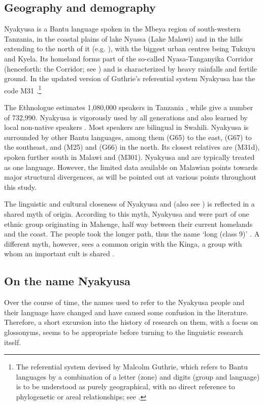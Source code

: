 \subsection{Geography and demography}
Nyakyusa is a Bantu language spoken in the Mbeya region of south-western Tanzania, in the coastal plains of lake Nyassa (Lake Malawi) and in the hills extending to the north of it (e.g. \citealt[1]{WilsonM1963}), with the biggest urban centres being Tukuyu and Kyela. Its homeland forms part of the so-called Nyasa-Tanganyika Corridor (henceforth: the Corridor; see ) and is characterized by heavy rainfalls and fertile ground. In the updated version of Guthrie's referential system Nyakyusa has the code M31 \citep{MahoJ2009}.\footnote{The referential system devised by Malcolm Guthrie, which refers to Bantu languages by a combination of a letter (zone) and digits (group and language) is to be understood as purely geographical, with no direct reference to phylogenetic or areal relationships; see \citet{MahoJ2003}.}

The Ethnologue estimates 1,080,000 speakers in Tanzania \citep{SimonsGFeddingC2017}, while \citet{MuzaleRRugemaliraJ2008} give a number of 732,990. Nyakyusa is vigorously used by all generations and also learned by local non-native speakers \citep{LewisM2009}. Most speakers are bilingual in Swahili. Nyakyusa is surrounded by other Bantu languages, among them  (G65) to the east,  (G67) to the southeast, and  (M25) and  (G66) in the north. Its closest relatives are  (M31d), spoken further south in Malawi and  (M301). Nyakyusa and  are typically treated as one language. However, the limited data available on Malawian  points towards major structural divergences, as will be pointed out at various points throughout this study.

The linguistic and cultural closeness of Nyakyusa and  (also see ) is reflected in a shared myth of origin. According to this myth, Nyakyusa and  were part of one ethnic group originating in Mahenge, half way between their current homelands and the coast. The  people took the longer path, thus the name  `long (class 9)' \citep[39]{Konter-KataniM1989}. A different myth, however, sees a common origin with the Kinga, a group with whom an important cult is shared \citep[ch. 7]{WeberP1998}.

\subsection{On the name Nyakyusa}
\largerpage[1]
Over the course of time, the names used to refer to the Nyakyusa people and their language have changed and have caused some confusion in the literature. Therefore, a short excursion into the history of research on them, with a focus on glossonyms, seems to be appropriate before turning to the linguistic research itself.

